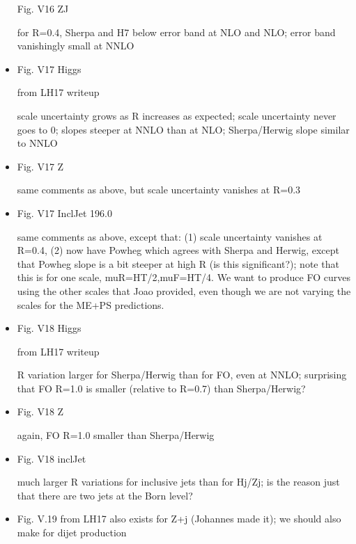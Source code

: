\documentclass[aps,prd,onecolumn,fleqn,superscriptaddress,groupedaddress,nofootinbib,preprintnumbers,nobalancelastpage]{revtex4}
\begin{document}
\begin{itemize}
Fig. V16 ZJ

for R=0.4, Sherpa and H7 below error band at NLO and NLO; error band vanishingly small at NNLO

\item 

Fig. V17 Higgs

from LH17 writeup

scale uncertainty grows as R increases as expected; scale uncertainty never goes to 0; slopes steeper at NNLO than at NLO;  Sherpa/Herwig slope similar to NNLO

\item 

Fig. V17 Z

same comments as above, but scale uncertainty vanishes at R=0.3

\item

Fig. V17 InclJet 196.0

same comments as above, except that: (1) scale uncertainty vanishes at R=0.4, (2) now have Powheg which agrees with Sherpa and Herwig, except that Powheg slope is a bit steeper at high R
(is this significant?); note that this is for one scale, muR=HT/2,muF=HT/4. We want to produce FO curves using the other scales that Joao provided, even though we are not varying the scales for the ME+PS predictions. 

\item 

Fig. V18 Higgs

from LH17 writeup

R variation larger for Sherpa/Herwig than for FO, even at NNLO; surprising that FO R=1.0 is smaller (relative to R=0.7) than Sherpa/Herwig?

\item

Fig. V18 Z

again, FO R=1.0 smaller than Sherpa/Herwig

\item

Fig. V18 inclJet

much larger R variations for inclusive jets than for Hj/Zj; is the reason just that there are two jets at the Born level? 

\item

Fig. V.19 from LH17 also exists for Z+j (Johannes made it); we should also make for dijet production

\end{itemize}
\end{document}
